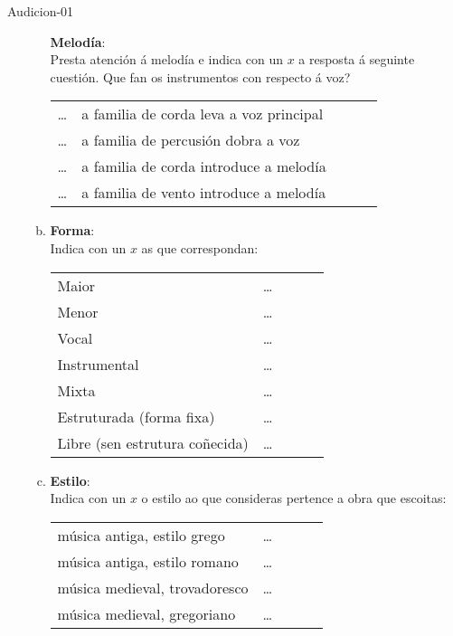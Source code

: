 \begin{defproblem}{Audicion-01}
\begin{ejercicio}[]
\begin{enumerate}[1.-]
\begin{multicols}{2}
\begin{enumerate}[a)]
			\textbf{Melodía}: \\
				\small{
				Presta atención á melodía e indica con un $x$ a resposta á seguinte cuestión. 
				Que fan os instrumentos con respecto á voz? 
				}
				\par
            \normalsize	
               \par
			\begin{tabular}{lllll} 
			    \ldots & \small{a familia de corda leva a voz principal} & & \\
			    \ldots & \small{a familia de percusión dobra a voz} & & \\
			    \ldots & \small{a familia de corda introduce a melodía} & & \\
			    \ldots & \small{a familia de vento introduce a melodía} & & \\

			\end{tabular}
            \normalsize
            \item
			\textbf{Forma}: \\
				\small{Indica con un $x$ as que correspondan:} \par
			\begin{tabular}{lllll} 
			     \small{Maior} & \ldots \\ 
			     \small{Menor} & \ldots \\ 
			     \small{Vocal} & \ldots \\ 
			     \small{Instrumental} & \ldots \\ 
			     \small{Mixta} & \ldots \\ 
			     \small{Estruturada (forma fixa)} & \ldots \\ 
			     \small{Libre (sen estrutura coñecida)} & \ldots \\ 
			\end{tabular}
            \normalsize
		    \item
			\textbf{Estilo}: \\
				\small{Indica con un $x$ o estilo ao que consideras pertence a obra que escoitas:} \par
			\begin{tabular}{lllll} 
			     \small{música antiga, estilo grego} & \ldots \\ 
			     \small{música antiga, estilo romano} & \ldots \\
			     \small{música medieval, trovadoresco} & \ldots \\
			     \small{música medieval, gregoriano } & \ldots \\			     
			\end{tabular}
		    \end{enumerate}
%			
       \end{multicols}
\par \vspace{0.3cm}
	\end{enumerate}
\end{ejercicio}


\end{defproblem}
